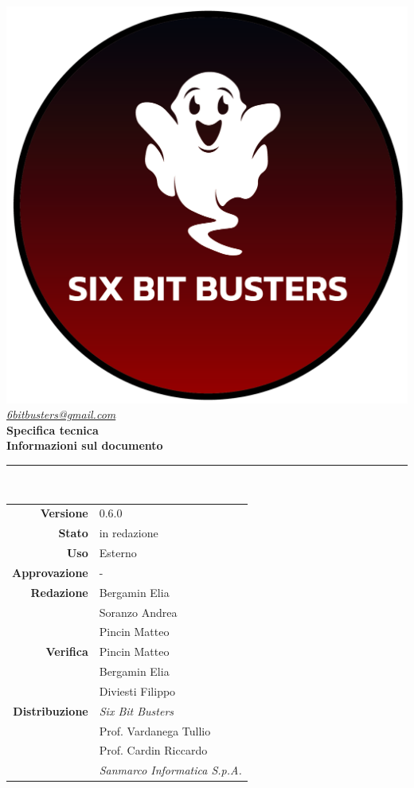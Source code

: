 \thispagestyle{empty}
\renewcommand{\arraystretch}{1.3}


\begin{titlepage}
	\begin{center}
		
	\includegraphics[scale = 0.6]{template/images/logo-circle.png}
	\\[0.8cm]
	\href{mailto:6bitbusters@gmail.com}		      	
	{\large{\textit{6bitbusters@gmail.com} } }\\[0.8cm]
	
	\Huge \textbf{Specifica tecnica} \\[0.5cm]

	\large \textbf{Informazioni sul documento} \\
	\rule{0.6\textwidth}{0.4pt}
	\\[0.5cm]
	\begin{tabular}{r|l}
		\textbf{Versione} & 0.6.0\\
		\textbf{Stato} & in redazione\\
		\textbf{Uso} & Esterno\\                         
		\textbf{Approvazione} & -\\                      
		\textbf{Redazione} & Bergamin Elia \\ & Soranzo Andrea \\ & Pincin Matteo \\
		\textbf{Verifica} & Pincin Matteo \\ & Bergamin Elia \\ & Diviesti Filippo \\                    
		\textbf{Distribuzione} & \textit{Six Bit Busters} \\ & Prof. Vardanega Tullio \\ & Prof. Cardin Riccardo \\ & \textit{Sanmarco Informatica S.p.A.}
	\end{tabular}	
	\\[0.8cm]


\end{center}
\end{titlepage}
